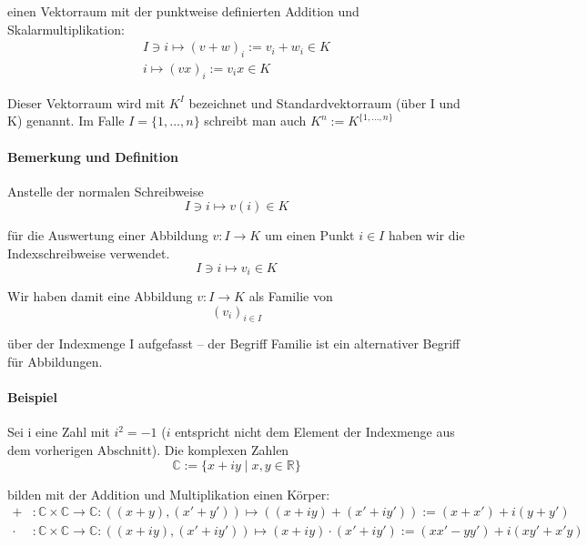 	einen Vektorraum mit der punktweise definierten Addition und Skalarmultiplikation:
	\begin{gather*}
		I\ni i \mapsto (v+w)_i := v_i+w_i\in K\\
		i \mapsto (vx)_i := v_ix \in K
	\end{gather*}

	Dieser Vektorraum wird mit $K^{I}$ bezeichnet und Standardvektorraum (über I und K) genannt. Im Falle $ I=\{1,...,n\} $ schreibt man auch $K^{n} := K^{\{1,...,n\}}$

\paragraph{Bemerkung und Definition}
	Anstelle der normalen Schreibweise
	\begin{equation*}
		I\ni i \mapsto v(i) \in K
	\end{equation*}

	für die Auswertung einer Abbildung  $v: I \to K$ um einen Punkt $i\in I$ haben wir die Indexschreibweise verwendet.
	\begin{equation*}
		I\ni i \mapsto v_i \in K
	\end{equation*}

	Wir haben damit eine Abbildung $v: I \to K$ als Familie von
	\begin{equation*}
		(v_i)_{i\in I}
	\end{equation*}

	über der Indexmenge I aufgefasst -- der Begriff Familie ist ein \glqq alternativer\grqq{} Begriff für Abbildungen.
	
\paragraph{Beispiel}
	Sei i eine \glqq Zahl\grqq{} mit $i^2=-1$ ($i$ entspricht nicht dem Element der Indexmenge aus dem vorherigen Abschnitt). Die komplexen Zahlen
	\begin{equation*}
		\mathbb{C}:=\{{x+iy\mid x,y\in \mathbb{R}}\}
	\end{equation*}
 
	bilden mit der Addition und Multiplikation einen Körper:
	\begin{align*}
		+&:\mathbb{C}\times \mathbb{C} \to \mathbb{C}: ((x+y),(x'+y')) \mapsto ((x+iy)+(x'+iy')) := (x+x')+i(y+y')\\
		\cdot &:\mathbb{C}\times \mathbb{C} \to \mathbb{C}: ((x+iy),(x'+iy'))\mapsto (x+iy)\cdot (x'+iy') :=(xx'-yy')+i(xy'+x'y)
	\end{align*}

